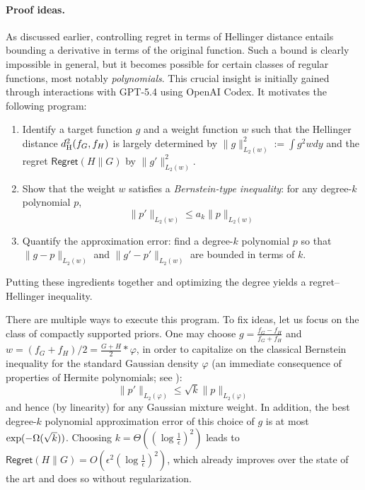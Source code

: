 \documentclass[letterpaper,11pt]{article}
\def\exp{\mathop{\rm exp}}
\newcommand{\hellinger}{d_{\rm H}}
\theoremstyle{definition}
\newcommand{\Regret}{\mathsf{Regret}}
\begin{document}
\paragraph{Proof ideas.}
As discussed earlier, controlling regret in terms of Hellinger distance entails bounding a derivative in terms of the original function.
Such a bound is clearly impossible in general, but it becomes possible for certain classes
of regular functions, most notably \textit{polynomials}. This crucial insight is
initially gained
through interactions with GPT-5.4 using OpenAI Codex. It motivates the following
program:
\begin{enumerate}
    \item 
    Identify a target function $g$ and a weight function $w$ such that 
    the Hellinger distance $\hellinger^2(f_G,f_H)$ is largely determined by 
    $\|g\|_{L_2(w)}^2 := \int g^2 w dy$ and the regret  $\Regret(H\|G)$  by 
    $\|g'\|_{L_2(w)}^2$.

    \item Show that the weight $w$ satisfies a \emph{Bernstein-type inequality}:
    for any degree-$k$ polynomial $p$,
    \begin{equation}
    \|p'\|_{L_2(w)} \leq a_k 
    \|p\|_{L_2(w)} 
        \label{eq:bernstein-general}
    \end{equation}

    \item Quantify the approximation error: find a degree-$k$ polynomial  $p$ so that $\|g-p\|_{L_2(w)}$ and 
    $\|g'-p'\|_{L_2(w)}$ are bounded in terms of $k$.
\end{enumerate}
Putting these ingredients together and optimizing the degree yields a regret--Hellinger inequality.

There are multiple ways to execute this program. To fix ideas, let us focus on the class of compactly supported priors. One may choose 
$g = \frac{f_G-f_H}{f_G+f_H}$ and $w=(f_G+f_H)/2 = \frac{G+H}{2}*\varphi$,
in order to capitalize on the classical Bernstein inequality for the standard Gaussian density $\varphi$ (an immediate consequence of properties of Hermite polynomials; see ):
    \begin{equation}
    \|p'\|_{L_2(\varphi)} \leq \sqrt{k} 
    \|p\|_{L_2(\varphi)} 
        \label{eq:bernstein-gaussian}
    \end{equation}
and hence (by linearity) for any Gaussian mixture weight. In addition,
the best degree-$k$ polynomial approximation error of this choice of $g$ is at most $\exp(-\Omega(\sqrt{k}))$. 
Choosing $k =\Theta((\log \frac{1}{\epsilon})^2)$ leads to $\Regret(H\|G) = O(\epsilon^2 (\log \frac{1}{\epsilon})^2)$, which already improves over the state of the art \cite{JiangZhang2009} and does so without regularization.
\end{document}
